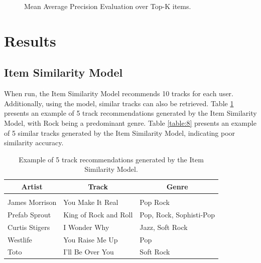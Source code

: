 \documentclass{article} %
\begin{document}
\begin{figure}[!htbp]
\begin{center}
\end{center}
\caption{Mean Average Precision Evaluation over Top-K items.}
\label{fig:mapeval}
\end{figure}

\section{Results}

\subsection{Item Similarity Model}

When run, the Item Similarity Model recommends 10 tracks for each user. Additionally, using the model, similar tracks can also be retrieved. Table \ref{table:7} presents an example of 5 track recommendations generated by the Item Similarity Model, with Rock being a predominant genre. Table \ref{table:8} presents an example of 5 similar tracks generated by the Item Similarity Model, indicating poor similarity accuracy.

\begin{table}[!htbp]
\caption{Example of 5 track recommendations generated by the Item Similarity Model.}
\label{table:7}
\begin{center}
\begin{tabular}{l l l}
\multicolumn{1}{c}{\bf Artist} & \multicolumn{1}{c}{\bf Track} & \multicolumn{1}{c}{\bf Genre}
\\ \hline \\
James Morrison & You Make It Real     & Pop Rock\\
Prefab Sprout & King of Rock and Roll & Pop, Rock, Sophisti-Pop\\
Curtis Stigers & I Wonder Why         & Jazz, Soft Rock\\
Westlife & You Raise Me Up            & Pop\\
Toto & I'll Be Over You               & Soft Rock\\
\end{tabular}
\end{center}
\end{table}
\end{document}
